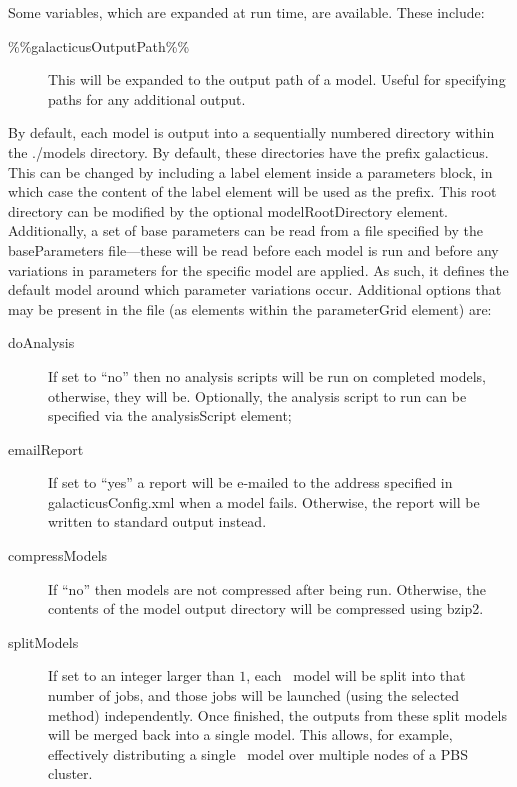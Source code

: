 Some variables, which are expanded at run time, are available. These include:
\begin{description}
\item [{\normalfont \ttfamily \%\%galacticusOutputPath\%\%}] This will be expanded to the output path of a model. Useful for specifying paths for any additional output.
\end{description}

By default, each model is output into a sequentially numbered directory within the {\normalfont \ttfamily ./models} directory. By default, these directories have the prefix {\normalfont \ttfamily galacticus}. This can be changed by including a {\normalfont \ttfamily label} element inside a {\normalfont \ttfamily parameters} block, in which case the content of the {\normalfont \ttfamily label} element will be used as the prefix. This root directory can be modified by the optional {\normalfont \ttfamily modelRootDirectory} element. Additionally, a set of base parameters can be read from a file specified by the {\normalfont \ttfamily baseParameters} file---these will be read before each model is run and before any variations in parameters for the specific model are applied. As such, it defines the default model around which parameter variations occur. Additional options that may be present in the file (as elements within the {\normalfont \ttfamily parameterGrid} element) are:
\begin{description}
\item[{\normalfont \ttfamily doAnalysis}]If set to ``no'' then no analysis scripts will be run on completed models, otherwise, they will be. Optionally, the analysis script to run can be specified via the {\normalfont \ttfamily analysisScript} element;
\item[{\normalfont \ttfamily emailReport}] If set to ``yes'' a report will be e-mailed to the address specified in {\normalfont \ttfamily galacticusConfig.xml} when a model fails. Otherwise, the report will be written to standard output instead.
\item[{\normalfont \ttfamily compressModels}] If ``no'' then models are not compressed after being run. Otherwise, the contents of the model output directory will be compressed using {\normalfont \ttfamily bzip2}.
\item[{\normalfont \ttfamily splitModels}] If set to an integer larger than $1$, each \glc\ model will be split into that number of jobs, and those jobs will be launched (using the selected method) independently. Once finished, the outputs from these split models will be merged back into a single model. This allows, for example, effectively distributing a single \glc\ model over multiple nodes of a PBS cluster.
\end{description}

